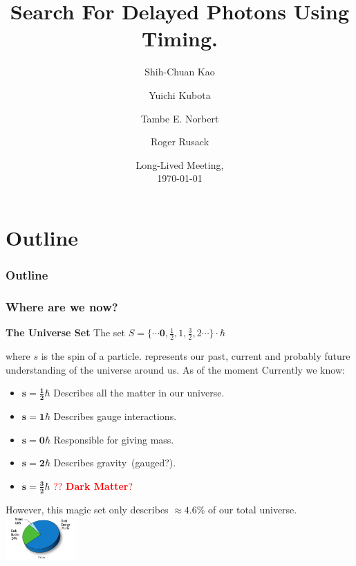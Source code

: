 \documentclass{beamer}
\title{Search For Delayed Photons Using Timing.}
\author[Tambe E. Norbert] %
{Shih-Chuan Kao\inst{1} \and Yuichi Kubota\inst{1} \and Tambe E. Norbert\inst{1} \and Roger Rusack\inst{1}}
\institute[UMN]{
\inst{1}%
University Of Minnesota
}
\date{ Long-Lived Meeting,\\ \today}
\begin{document}
\begin{frame}
\titlepage
\begin{center}
\href{mailto:norbe072@umn.edu}{}
\end{center}
\end{frame}
\section*{Outline}
\begin{frame}
\frametitle{\Huge Outline}
\tableofcontents
\end{frame}

\begin{frame}
\frametitle{\huge{Where are we now?}}
\begin{varblock}[7cm]{\textbf{The Universe Set}}
 The set  $S =\{ \cdots \mathbf{0}, \frac{1}{2}, 1,  \frac{3}{2}, 2  \cdots \} \cdot \hbar $ 
 \end{varblock}
 where $s$ is the spin of a particle. 
 represents our past, current and probably future understanding of the universe around us. As of the moment 
Currently we know:
 \begin{itemize}
  \item $\mathbf{s = \frac{1}{2}\hbar}$ Describes all the matter in our universe.
  \item $\mathbf{s = 1\hbar}$ Describes gauge interactions.
  \item $\mathbf{s = 0\hbar}$ Responsible for giving mass.
  \item $\mathbf{s = 2\hbar}$ Describes gravity~(gauged?).
  \item $\mathbf{s = \frac{3}{2}\hbar}$ \textcolor{red}{?? \textbf{Dark Matter}?}
 \end{itemize}

However, this magic set only describes $\approx 4.6$\% of our total universe.
\includegraphics[height=1.7cm,width=0.25\paperwidth]{THESISPLOTS/WMAPUniversePie.pdf}
\end{frame}



\end{document}
